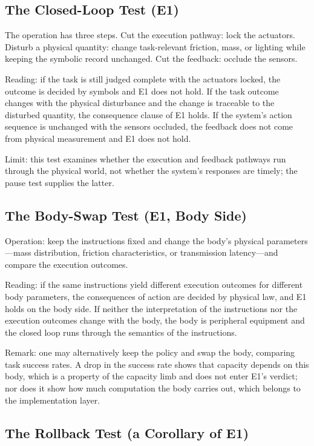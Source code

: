 \documentclass[10pt]{article}
\begin{document}
\subsection{The Closed-Loop Test (E1)}\label{sec:closedloop}

The operation has three steps. Cut the execution pathway: lock the actuators. Disturb a physical quantity: change task-relevant friction, mass, or lighting while keeping the symbolic record unchanged. Cut the feedback: occlude the sensors.

Reading: if the task is still judged complete with the actuators locked, the outcome is decided by symbols and E1 does not hold. If the task outcome changes with the physical disturbance and the change is traceable to the disturbed quantity, the consequence clause of E1 holds. If the system's action sequence is unchanged with the sensors occluded, the feedback does not come from physical measurement and E1 does not hold.

Limit: this test examines whether the execution and feedback pathways run through the physical world, not whether the system's responses are timely; the pause test supplies the latter.

\subsection{The Body-Swap Test (E1, Body Side)}\label{sec:swap}

Operation: keep the instructions fixed and change the body's physical parameters---mass distribution, friction characteristics, or transmission latency---and compare the execution outcomes.

Reading: if the same instructions yield different execution outcomes for different body parameters, the consequences of action are decided by physical law, and E1 holds on the body side. If neither the interpretation of the instructions nor the execution outcomes change with the body, the body is peripheral equipment and the closed loop runs through the semantics of the instructions.

Remark: one may alternatively keep the policy and swap the body, comparing task success rates. A drop in the success rate shows that capacity depends on this body, which is a property of the capacity limb and does not enter E1's verdict; nor does it show how much computation the body carries out, which belongs to the implementation layer.

\subsection{The Rollback Test (a Corollary of E1)}\label{sec:rollback}
\end{document}
